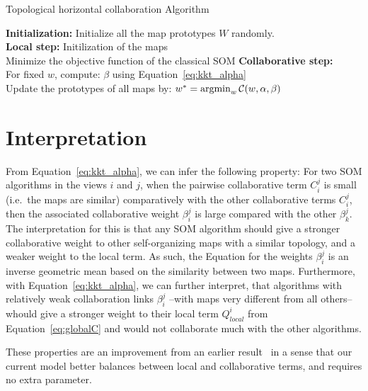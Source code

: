 \begin{algorithm}[!h]
\label{alg:algoGen}
\SetAlgoLined{}
	\vspace{0.05cm}
	\caption{Topological horizontal collaboration Algorithm}
	\vspace{0.05cm}
	\textbf{Initialization:} Initialize all the map prototypes $W$ randomly. \\
	\textbf{Local step:} Initilization of the maps\\
	 {
		Minimize the objective function of the classical SOM
	} 
	\textbf{Collaborative step:}\\
	 {
		For fixed $w$, compute:
		$\beta$ using Equation~\eqref{eq:kkt_alpha} \\	 
		Update the prototypes of all maps by: 
		$ 
		w^{*} =  \operatornamewithlimits{argmin}_{w}\mathcal{C}(w,\alpha,\beta) 
		$
	}	 
\end{algorithm}

\section{Interpretation}
\label{sec:interpretation}

From Equation~\eqref{eq:kkt_alpha}, we can infer the following property: For two SOM algorithms in the views $i$ and $j$, when the pairwise collaborative term $C^j_i$ is small (i.e.\ the maps are similar) comparatively with the other collaborative terms $C^j_i$, then the associated collaborative weight $\beta^j_i$ is large compared with the other $\beta_k^j$. The interpretation for this is that any SOM algorithm should give a stronger collaborative weight to other self-organizing maps with a similar topology, and a weaker weight to the local term. As such, the Equation for the weights $\beta^j_i$ is an inverse geometric mean based on the similarity between two maps. 
Furthermore, with Equation~\eqref{eq:kkt_alpha}, we can further interpret, that algorithms with relatively weak collaboration links $\beta^j_i$ --with maps very different from all others-- whould give a stronger weight to their local term $Q^i_{local}$ from Equation~\eqref{eq:globalC} and would not collaborate much with the other algorithms. 

These properties are an improvement from an earlier result~\cite{Sublime2017} in a sense that our current model better balances between local and collaborative terms, and requires no extra parameter.

